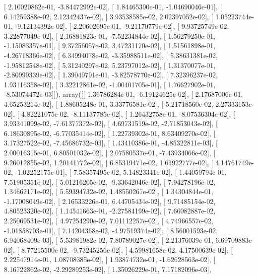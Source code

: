 \documentclass{article}
\begin{document}
       [  2.10020862e-01,  -3.84472992e-02],
       [  1.84465390e-01,  -1.04690046e-01],
       [  6.14259388e-02,   2.12342437e-02],
       [  3.93538585e-02,   2.02397052e-02],
       [  1.05223744e-01,  -9.12134392e-02],
       [  2.20602695e-01,  -9.21170779e-02],
       [  9.93725749e-02,   3.22877049e-02],
       [  2.16881823e-01,  -7.52234844e-02],
       [  1.56279250e-01,  -1.15083357e-01],
       [  9.37256057e-02,   3.47231170e-02],
       [  1.51561898e-01,  -4.26718366e-02],
       [  6.34994078e-02,  -3.35988511e-02],
       [  5.38631381e-02,  -1.95812548e-02],
       [  5.31240297e-02,   5.23797012e-02],
       [  1.31370077e-01,  -2.80999339e-02],
       [  1.39049791e-01,  -3.82578770e-02],
       [  7.32396237e-02,   1.93116358e-02],
       [  3.32212861e-02,  -1.00401705e-01],
       [  1.76627902e-01,  -8.53074472e-03]]), array([[  1.36786284e-01,  -6.19124625e-02],
       [  2.17687006e-01,   4.65253214e-02],
       [  1.88605248e-01,   3.33776581e-02],
       [  5.21718560e-02,   2.27333153e-02],
       [  4.82221075e-02,  -8.11137785e-02],
       [  1.26432758e-01,  -8.07536304e-02],
       [  3.93341099e-02,  -7.61377372e-02],
       [  4.69731519e-02,  -2.71853043e-02],
       [  6.18630895e-02,  -6.77035414e-02],
       [  1.22739302e-01,   8.63409270e-02],
       [  3.17327522e-02,  -7.45686732e-03],
       [  1.43410386e-01,  -4.85322811e-03],
       [  2.00016315e-01,   6.80501032e-02],
       [  2.07580537e-01,  -7.43934066e-02],
       [  9.26012855e-02,   1.20141772e-02],
       [  6.85319471e-02,   1.61922777e-02],
       [  4.14761749e-02,  -1.02252175e-01],
       [  7.58357495e-02,   5.14823341e-02],
       [  1.44059794e-01,   7.51905351e-02],
       [  5.01216205e-02,  -9.33642046e-02],
       [  7.94278196e-02,   1.34662171e-02],
       [  5.59394732e-02,   1.48550267e-02],
       [  1.34304844e-01,  -1.17008049e-02],
       [  2.16533226e-01,   6.44705434e-02],
       [  9.71485154e-02,   4.80523320e-02],
       [  1.14541663e-01,  -2.27584199e-02],
       [  7.66082887e-02,   2.25069531e-02],
       [  4.97254290e-02,   7.01112257e-02],
       [  4.74966557e-02,  -1.01858703e-01],
       [  7.14204368e-02,  -4.97519374e-02],
       [  8.56001593e-02,   6.94068409e-03],
       [  5.53981982e-02,   7.80789027e-02],
       [  2.21376039e-01,   6.69709883e-02],
       [  8.77215500e-02,  -9.73245256e-02],
       [  4.59981658e-02,   4.17500639e-02],
       [  2.22547914e-01,   1.08708385e-02],
       [  1.93874732e-01,  -1.62628563e-02],
       [  8.16722862e-02,  -2.29289253e-02],
       [  1.35026229e-01,   7.17182096e-03],
\end{document}
